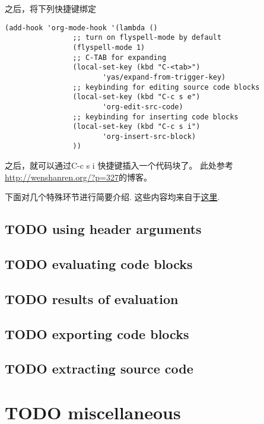 \documentclass[10pt,a4paper]{article}
\begin{document}
之后，将下列快捷键绑定

\begin{verbatim}
(add-hook 'org-mode-hook '(lambda ()
			    ;; turn on flyspell-mode by default
			    (flyspell-mode 1)
			    ;; C-TAB for expanding
			    (local-set-key (kbd "C-<tab>")
					   'yas/expand-from-trigger-key)
			    ;; keybinding for editing source code blocks
			    (local-set-key (kbd "C-c s e")
					   'org-edit-src-code)
			    ;; keybinding for inserting code blocks
			    (local-set-key (kbd "C-c s i")
					   'org-insert-src-block)
			    ))
\end{verbatim}

之后，就可以通过C-c s i 快捷键插入一个代码块了。
此处参考\url{http://wenshanren.org/?p=327}的博客。

下面对几个特殊环节进行简要介绍.
这些内容均来自于\href{https://orgmode.org/guide/Working-with-Source-Code.html\#Working-with-Source-Code}{这里}.
\subsection{{\bfseries\sffamily TODO} using header arguments}
\label{sec:orgaa1b521}
\subsection{{\bfseries\sffamily TODO} evaluating code blocks}
\label{sec:org37dbf6b}
\subsection{{\bfseries\sffamily TODO} results of evaluation}
\label{sec:org4ee290f}
\subsection{{\bfseries\sffamily TODO} exporting code blocks}
\label{sec:org8a10c37}
\subsection{{\bfseries\sffamily TODO} extracting source code}
\label{sec:org00ae2e8}

\section{{\bfseries\sffamily TODO} miscellaneous}
\label{sec:org6fe31d1}
\end{document}
